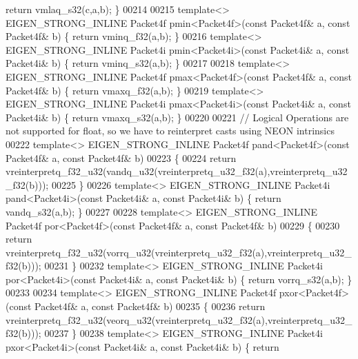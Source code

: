 \begin{DoxyCode}
{{{      return} vmlaq\_s32(c,a,b); \}
00214 
00215 \textcolor{keyword}{template}<> EIGEN\_STRONG\_INLINE Packet4f pmin<Packet4f>(\textcolor{keyword}{const} Packet4f& a, \textcolor{keyword}{const} Packet4f& b) \{ \textcolor{keywordflow}{return} 
      vminq\_f32(a,b); \}
00216 \textcolor{keyword}{template}<> EIGEN\_STRONG\_INLINE Packet4i pmin<Packet4i>(\textcolor{keyword}{const} Packet4i& a, \textcolor{keyword}{const} Packet4i& b) \{ \textcolor{keywordflow}{return} 
      vminq\_s32(a,b); \}
00217 
00218 \textcolor{keyword}{template}<> EIGEN\_STRONG\_INLINE Packet4f pmax<Packet4f>(\textcolor{keyword}{const} Packet4f& a, \textcolor{keyword}{const} Packet4f& b) \{ \textcolor{keywordflow}{return} 
      vmaxq\_f32(a,b); \}
00219 \textcolor{keyword}{template}<> EIGEN\_STRONG\_INLINE Packet4i pmax<Packet4i>(\textcolor{keyword}{const} Packet4i& a, \textcolor{keyword}{const} Packet4i& b) \{ \textcolor{keywordflow}{return} 
      vmaxq\_s32(a,b); \}
00220 
00221 \textcolor{comment}{// Logical Operations are not supported for float, so we have to reinterpret casts using NEON intrinsics}
00222 \textcolor{keyword}{template}<> EIGEN\_STRONG\_INLINE Packet4f pand<Packet4f>(\textcolor{keyword}{const} Packet4f& a, \textcolor{keyword}{const} Packet4f& b)
00223 \{
00224   \textcolor{keywordflow}{return} vreinterpretq\_f32\_u32(vandq\_u32(vreinterpretq\_u32\_f32(a),vreinterpretq\_u32\_f32(b)));
00225 \}
00226 \textcolor{keyword}{template}<> EIGEN\_STRONG\_INLINE Packet4i pand<Packet4i>(\textcolor{keyword}{const} Packet4i& a, \textcolor{keyword}{const} Packet4i& b) \{ \textcolor{keywordflow}{return} 
      vandq\_s32(a,b); \}
00227 
00228 \textcolor{keyword}{template}<> EIGEN\_STRONG\_INLINE Packet4f por<Packet4f>(\textcolor{keyword}{const} Packet4f& a, \textcolor{keyword}{const} Packet4f& b)
00229 \{
00230   \textcolor{keywordflow}{return} vreinterpretq\_f32\_u32(vorrq\_u32(vreinterpretq\_u32\_f32(a),vreinterpretq\_u32\_f32(b)));
00231 \}
00232 \textcolor{keyword}{template}<> EIGEN\_STRONG\_INLINE Packet4i por<Packet4i>(\textcolor{keyword}{const} Packet4i& a, \textcolor{keyword}{const} Packet4i& b) \{ \textcolor{keywordflow}{return} 
      vorrq\_s32(a,b); \}
00233 
00234 \textcolor{keyword}{template}<> EIGEN\_STRONG\_INLINE Packet4f pxor<Packet4f>(\textcolor{keyword}{const} Packet4f& a, \textcolor{keyword}{const} Packet4f& b)
00235 \{
00236   \textcolor{keywordflow}{return} vreinterpretq\_f32\_u32(veorq\_u32(vreinterpretq\_u32\_f32(a),vreinterpretq\_u32\_f32(b)));
00237 \}
00238 \textcolor{keyword}{template}<> EIGEN\_STRONG\_INLINE Packet4i pxor<Packet4i>(\textcolor{keyword}{const} Packet4i& a, \textcolor{keyword}{const} Packet4i& b) \{ \textcolor{keywordflow}{return} 
}}
\end{DoxyCode}
